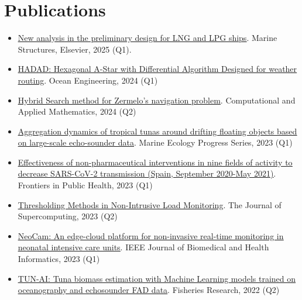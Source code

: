 \documentclass[a4paper,11pt]{article}
\newcommand{\resumeItem}[1]{
	\item\small{#1}
}
\newcommand{\resumeItemListStart}{\begin{itemize}[rightmargin=0.11in]}
\newcommand{\resumeItemListEnd}{\end{itemize}}
\begin{document}
	\section{Publications}
	\resumeItemListStart{}
	\resumeItem{\href{https://doi.org/10.1016/j.marstruc.2025.103863}{\uline{New analysis in the preliminary design for LNG and LPG ships}}. Marine Structures, Elsevier, 2025 (Q1).}
	\resumeItem{\href{https://benchmark.weathernavigation.com/static/pdfs/benchmarks-1.pdf}{\uline{HADAD: Hexagonal A-Star with Differential Algorithm Designed for weather routing}}. Ocean Engineering, 2024 (Q1)}
	\resumeItem{\href{https://doi.org/10.1007/s40314-024-02756-w}{\uline{Hybrid Search method for Zermelo's navigation problem}}. Computational and Applied Mathematics, 2024 (Q2)}
	\resumeItem{\href{https://doi.org/10.3354/meps14338}{\uline{Aggregation dynamics of tropical tunas around drifting floating objects based on large-scale echo-sounder data}}. Marine Ecology Progress Series, 2023 (Q1)}
	\resumeItem{\href{https://doi.org/10.21203/rs.3.rs-1732801/v1}{\uline{Effectiveness of non-pharmaceutical interventions in nine fields of activity to decrease SARS-CoV-2 transmission (Spain, September 2020-May 2021)}}. Frontiers in Public Health, 2023 (Q1)}
	\resumeItem{\href{https://doi.org/10.21203/rs.3.rs-1923023/v1}{\uline{Thresholding Methods in Non-Intrusive Load Monitoring}}. The Journal of Supercomputing, 2023 (Q2)}
	\resumeItem{\href{https://doi.org/10.1109/JBHI.2023.3240245}{\uline{NeoCam: An edge-cloud platform for non-invasive real-time monitoring in neonatal intensive care units}}. IEEE Journal of Biomedical and Health Informatics, 2023 (Q1)}
	\resumeItem{\href{https://doi.org/10.1016/j.fishres.2022.106263}{\uline{TUN-AI: Tuna biomass estimation with Machine Learning models trained on oceanography and echosounder FAD data}}. Fisheries Research, 2022 (Q2)}
	\resumeItemListEnd{}
	
\end{document}
